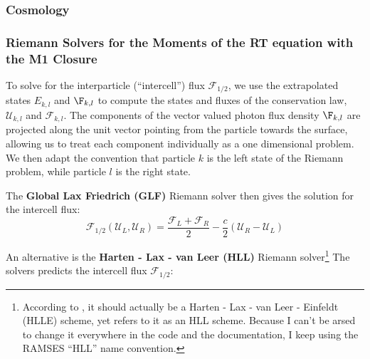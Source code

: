 




\subsubsection{Cosmology}






\subsubsection{Riemann Solvers for the Moments of the RT equation with the M1
Closure} \label{chap:riemann}


To solve for the interparticle (``intercell'') flux $\mathcal{F}_{1/2}$, we use the extrapolated
states $E_{k,l}$ and $\F_{k,l}$ to compute the states and fluxes of the conservation law,
$\mathcal{U}_{k,l}$ and $\mathcal{F}_{k,l}$. The components of the vector valued photon flux 
density $\F_{k,l}$ are projected along the unit vector pointing from the particle towards the 
surface, allowing us to treat each component individually as a one dimensional problem. We then 
adapt the convention that particle $k$ is the left state of the Riemann problem, while particle $l$ 
is the right state.

The \textbf{Global Lax Friedrich (GLF)} Riemann solver \citep{ramses-rt13} then gives the
solution for the intercell flux:
\begin{equation}
	\mathcal{F}_{1/2}(\mathcal{U}_L, \mathcal{U}_R) =
		\frac{\mathcal{F}_{L} + \mathcal{F}_{R}}{2} -
		\frac{c}{2} \left(\mathcal{U}_R - \mathcal{U}_L \right) \label{eq:riemann-GLF}
\end{equation}



An alternative is the \textbf{Harten - Lax - van Leer (HLL)} Riemann solver\footnote{According to 
\citet{gonzalezHERACLESThreedimensionalRadiation2007}, it should actually be a Harten - Lax - van 
Leer - Einfeldt (HLLE) scheme, yet \citet{ramses-rt13} refers to it as an HLL scheme. Because I 
can't be arsed to change it everywhere in the code and the documentation, I keep using the RAMSES 
``HLL'' name convention.} The solvers predicts the intercell flux $\mathcal{F}_{1/2}$:

